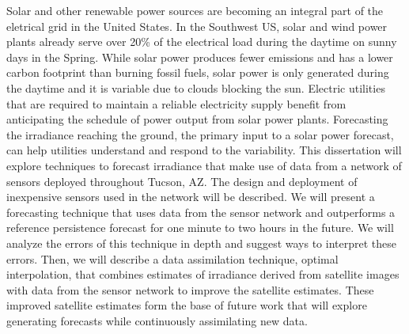 Solar and other renewable power sources are becoming an integral part
of the eletrical grid in the United States.
In the Southwest US, solar and wind power plants already serve over 20\%
of the electrical load during the daytime on sunny days in the Spring.
While solar power produces fewer emissions and has a lower carbon
footprint than burning fossil fuels, solar power is only generated
during the daytime and it is variable due to clouds blocking the sun.
Electric utilities that are required to maintain a reliable
electricity supply benefit from anticipating the schedule of power
output from solar power plants.
Forecasting the irradiance reaching the ground, the primary input to a
solar power forecast, can help utilities understand and respond to the
variability.
This dissertation will explore techniques to forecast irradiance that
make use of data from a network of sensors deployed throughout Tucson,
AZ.
The design and deployment of inexpensive sensors used in the network
will be described.
We will present a forecasting technique that uses data from the
sensor network and outperforms a reference persistence forecast for
one minute to two hours in the future.
We will analyze the errors of this technique in depth and suggest ways
to interpret these errors.
Then, we will describe a data assimilation technique, optimal
interpolation, that combines estimates of irradiance derived from
satellite images with data from the sensor network to improve the
satellite estimates.
These improved satellite estimates form the base of future work that will
explore generating forecasts while continuously assimilating new data.

